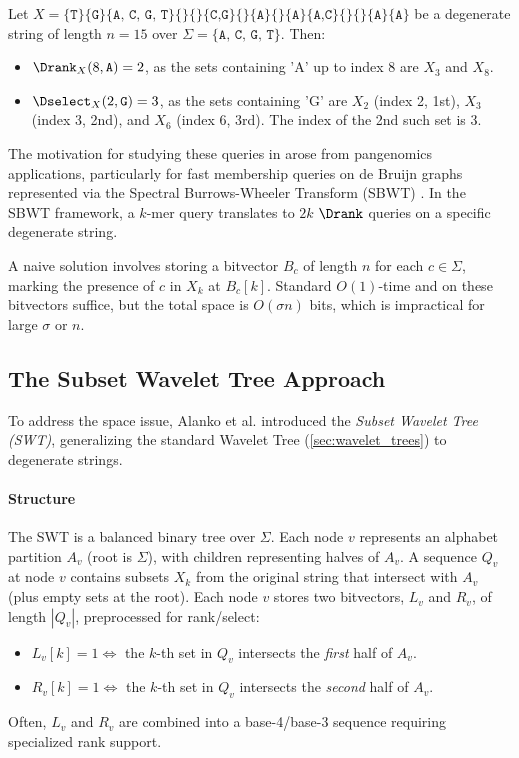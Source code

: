 \begin{example}
    Let $X = \{\texttt{T}\} \{\texttt{G}\} \{\texttt{A, C, G, T}\} \{\} \{\} \{\texttt{C,G}\} \{\} \{\texttt{A}\} \{\} \{\texttt{A}\} \{\texttt{A,C}\} \{\} \{\} \{\texttt{A}\} \{\texttt{A}\}$ be a degenerate string of length $n=15$ over $\Sigma = \{\texttt{A, C, G, T}\}$. Then:
    \begin{itemize}
        \item $\Drank_X(8, \texttt{A}) = 2$, as the sets containing 'A' up to index 8 are $X_3$ and $X_8$.
        \item $\Dselect_X(2, \texttt{G}) = 3$, as the sets containing 'G' are $X_2$ (index 2, 1st), $X_3$ (index 3, 2nd), and $X_6$ (index 6, 3rd). The index of the 2nd such set is 3.
    \end{itemize}
\end{example}

The motivation for studying these queries in \cite{SubsetWT} arose from pangenomics applications, particularly for fast membership queries on de Bruijn graphs represented via the Spectral Burrows-Wheeler Transform (SBWT) \cite{alanko2023small}. In the SBWT framework, a $k$-mer query translates to $2k$ $\Drank$ queries on a specific degenerate string.

A naive solution involves storing a bitvector $B_c$ of length $n$ for each $c \in \Sigma$, marking the presence of $c$ in $X_k$ at $B_c[k]$. Standard $O(1)$-time \Rank{} and \Select{} on these bitvectors suffice, but the total space is $O(\sigma n)$ bits, which is impractical for large $\sigma$ or $n$.

\subsection{The Subset Wavelet Tree Approach}

To address the space issue, Alanko et al. \cite{SubsetWT} introduced the \emph{Subset Wavelet Tree (SWT)}, generalizing the standard Wavelet Tree (\autoref{sec:wavelet_trees}) to degenerate strings.

\paragraph{Structure} The SWT is a balanced binary tree over $\Sigma$. Each node $v$ represents an alphabet partition $A_v$ (root is $\Sigma$), with children representing halves of $A_v$. A sequence $Q_v$ at node $v$ contains subsets $X_k$ from the original string that intersect with $A_v$ (plus empty sets at the root). Each node $v$ stores two bitvectors, $L_v$ and $R_v$, of length $|Q_v|$, preprocessed for rank/select:
\begin{itemize}
    \item $L_v[k] = 1 \iff$ the $k$-th set in $Q_v$ intersects the \emph{first} half of $A_v$.
    \item $R_v[k] = 1 \iff$ the $k$-th set in $Q_v$ intersects the \emph{second} half of $A_v$.
\end{itemize}
Often, $L_v$ and $R_v$ are combined into a base-4/base-3 sequence requiring specialized rank support.

